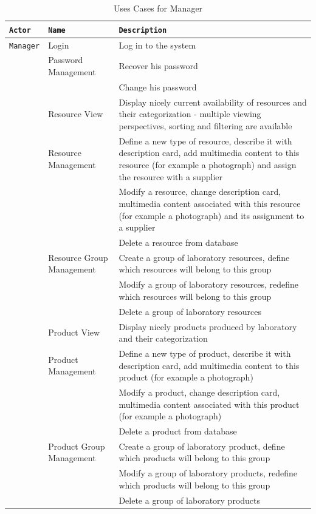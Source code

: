 \documentclass[a4paper,11pt,twoside]{report}
\theoremstyle{definition}
\begin{document}
\begin{longtable}{|p{3cm}|p{3cm}|p{10cm}|}
\caption[Uses Cases for Manager]{Uses Cases for Manager}
\label{Use Cases Manager}
\tabularnewline

\hline
\texttt{Actor} & \texttt{Name} & \texttt{Description} \\ \hline
\texttt{Manager} & Login & Log in to the system\\  \cline{2-3}
\texttt{} & Password Management & Recover his password\\  \cline{3-3}
\texttt{} & & Change his password\\ \cline{2-3}

\texttt{} & Resource View & Display nicely current availability of resources and their categorization - multiple viewing perspectives, sorting and filtering are available\\ \cline{2-3}
\texttt{} & Resource Management & Define a new type of resource, describe it with description card, add multimedia content to this resource (for example a photograph) and assign the resource with a supplier\\ \cline{3-3}
\texttt{} & & Modify a resource, change description card, multimedia content associated with this resource (for example a photograph) and its assignment to a supplier\\ \cline{3-3}
\texttt{} & & Delete a resource from database\\ \cline{2-3}

\texttt{} & Resource Group Management & Create a group of laboratory resources, define which resources will belong to this group\\ \cline{3-3}
\texttt{} & & Modify a group of laboratory resources, redefine which resources will belong to this group\\ \cline{3-3}
\texttt{} & & Delete a group of laboratory resources\\ \cline{2-3}
\texttt{} & Product View & Display nicely products produced by laboratory and their categorization\\ \cline{2-3}
\texttt{} & Product Management & Define a new type of product, describe it with description card, add multimedia content to this product (for example a photograph)\\ \cline{3-3}
\texttt{} & & Modify a product, change description card, multimedia content associated with this product (for example a photograph)\\ \cline{3-3}
\texttt{} & & Delete a product from database\\ \cline{2-3}
\texttt{} & Product Group Management & Create a group of laboratory product, define which products will belong to this group\\ \cline{3-3}
\texttt{} & & Modify a group of laboratory products, redefine which products will belong to this group\\ \cline{3-3}
\texttt{} & & Delete a group of laboratory products\\ \cline{2-3}


\end{longtable}
\end{document}
